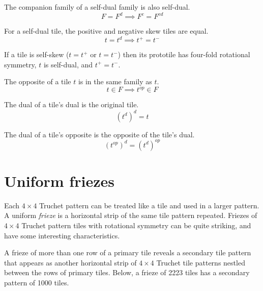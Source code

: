 \documentclass{tufte-book}
\begin{document}
\begin{theorem}
The companion family of a self-dual family is also self-dual.  
$$F = F^d \implies F^c = F^{cd}$$     
\end{theorem}

\begin{theorem}
For a self-dual tile, the positive and negative skew tiles are equal. 
$$t = t^d \implies t^+ = t^-$$
\end{theorem}

\begin{theorem}
If a tile is self-skew ($t=t^+$ or $t=t^-$) then its prototile has four-fold rotational symmetry, $t$ is self-dual, and $t^+ = t^-$. 
\end{theorem}

\begin{theorem}
The opposite of a tile $t$ is in the same family as $t$. 
$$t\in F \implies t^{op} \in F$$
\end{theorem}

\begin{theorem}
The dual of a tile's dual is the original tile. 
$$(t^d)^d = t$$
\end{theorem}

\begin{theorem}
The dual of a tile's opposite is the opposite of the tile's dual. 
$$(t^{op})^d = (t^d)^{op}$$
\end{theorem}


\newpage


\chapter{Uniform friezes}

\noindent
Each $4\times 4$ Truchet pattern can be treated like a tile and used in a larger pattern. A uniform \textit{frieze} is a horizontal strip of the same tile pattern repeated. Friezes of $4\times 4$ Truchet pattern tiles with rotational symmetry can be quite striking, and have some interesting characteristics. 

\vspace{0.5cm}
\noindent
A frieze of more than one row of a primary tile reveals a secondary tile pattern that appears as another horizontal strip of $4\times 4$ Truchet tile patterns nestled between the rows of primary tiles. Below, a frieze of 2223 tiles has a secondary pattern of 1000 tiles.
\,

\vspace{0.5cm}

\end{document}
